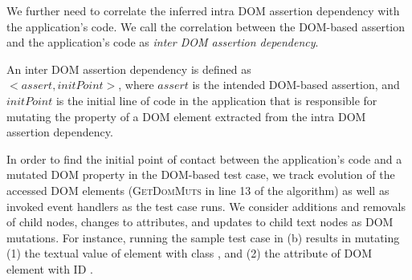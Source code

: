 We further need to correlate the inferred intra DOM assertion dependency with the application's code.
We call the correlation between the DOM-based assertion and the application's code as \emph{inter DOM assertion dependency}.
\begin{mydef}
\label{def:interDOMDep}  
An inter DOM assertion dependency is defined as\\
$<assert, initPoint>$, where $assert$ is the intended DOM-based assertion, and $initPoint$ is the initial line of code in the application that is responsible for mutating the property of a DOM element extracted from the intra DOM assertion dependency.
\end{mydef}
In order to find the initial point of contact between the application's code and a mutated DOM property in the DOM-based test case, we track evolution of the accessed DOM elements (\textsc{GetDomMuts} in line 13 of the algorithm) as well as invoked event handlers as the test case runs. 
We consider additions and removals of child nodes, changes to attributes, and updates to child text nodes as DOM mutations. For instance, running the sample test case in (b) results in mutating (1) the textual value of  element with class , and (2) the  attribute of DOM element with ID .

